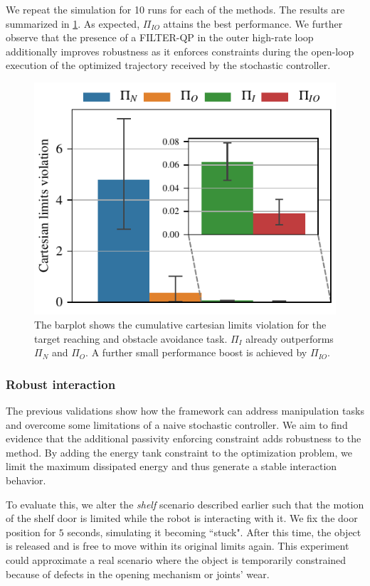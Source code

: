 We repeat the simulation for 10 runs for each of the methods. The results are summarized in \fig \ref{fig:obstacle_avoidance}. As expected, $\Pi_{IO}$ attains the best performance. We further observe that the presence of a FILTER-QP in the outer high-rate loop additionally improves robustness as it enforces constraints during the open-loop execution of the optimized trajectory received by the stochastic controller. 
\begin{figure}[t]
    \centering
    \includegraphics[width=0.7\columnwidth]{figures/obstacle_avoidance/obstacle_avoidance_test.pdf}
    \caption{The barplot shows the cumulative cartesian limits violation for the target reaching and obstacle avoidance task. $\Pi_{I}$ already outperforms $\Pi_{N}$ and $\Pi_{O}$. A further small performance boost is achieved by $\Pi_{IO}$.}
    \label{fig:obstacle_avoidance}
\end{figure}

\vspace{0.3cm}
\subsubsection{Robust interaction}
The previous validations show how the framework can address manipulation tasks and overcome some limitations of a naive stochastic controller. We aim to find evidence that the additional passivity enforcing constraint adds robustness to the method. By adding the energy tank constraint to the optimization problem, we limit the maximum dissipated energy and thus generate a stable interaction behavior.

To evaluate this, we alter the \emph{shelf} scenario described earlier such that the motion of the shelf door is limited while the robot is interacting with it. We fix the door position for $5$ seconds, simulating it becoming ``stuck". After this time, the object is released and is free to move within its original limits again. This experiment could approximate a real scenario where the object is temporarily constrained because of defects in the opening mechanism or joints' wear.

